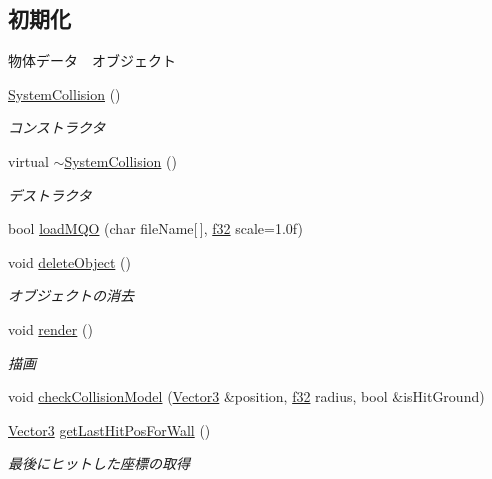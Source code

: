 \subsection*{初期化}
\label{_amgrpd1671579eecfbaefb14e36fbca13c88c}%
物体データ　オブジェクト \begin{DoxyCompactItemize}
\item 
\hyperlink{class_system_collision_a029dd2a26bbe98eb77f5b0bb084204f6}{System\-Collision} ()
\begin{DoxyCompactList}\small\item\em コンストラクタ \end{DoxyCompactList}\item 
virtual \hyperlink{class_system_collision_ac666887037b1dc14e32652af28abee66}{$\sim$\-System\-Collision} ()
\begin{DoxyCompactList}\small\item\em デストラクタ \end{DoxyCompactList}\item 
bool \hyperlink{class_system_collision_a92454bf408ff087cf91215758a4297a6}{load\-M\-Q\-O} (char file\-Name\mbox{[}$\,$\mbox{]}, \hyperlink{_main_8h_a5f6906312a689f27d70e9d086649d3fd}{f32} scale=1.\-0f)
\item 
void \hyperlink{class_system_collision_ae5b6d80c1ed9f51596e44a75ce4e8ff3}{delete\-Object} ()
\begin{DoxyCompactList}\small\item\em オブジェクトの消去 \end{DoxyCompactList}\item 
void \hyperlink{class_system_collision_a232132673dbadadb4fe9d018bf2235ca}{render} ()
\begin{DoxyCompactList}\small\item\em 描画 \end{DoxyCompactList}\item 
void \hyperlink{class_system_collision_aeb8a2e7a0907e24e6cc291bb61be118c}{check\-Collision\-Model} (\hyperlink{struct_vector3}{Vector3} \&position, \hyperlink{_main_8h_a5f6906312a689f27d70e9d086649d3fd}{f32} radius, bool \&is\-Hit\-Ground)
\item 
\hyperlink{struct_vector3}{Vector3} \hyperlink{class_system_collision_a2894d1a5b42db2b9625d1317803413fa}{get\-Last\-Hit\-Pos\-For\-Wall} ()
\begin{DoxyCompactList}\small\item\em 最後にヒットした座標の取得 \end{DoxyCompactList}\item 

\end{DoxyCompactItemize}
